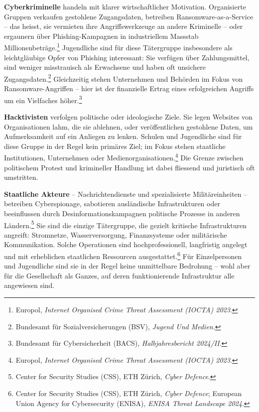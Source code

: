 \documentclass[
  nswissgerman,
  a4paper,
  DIV=11,
  numbers=noendperiod,
  ngerman]{scrreprt}
\begin{document}
\textbf{Cyberkriminelle} handeln mit klarer wirtschaftlicher Motivation.
Organisierte Gruppen verkaufen gestohlene Zugangsdaten, betreiben
Ransomware-as-a-Service -- das heisst, sie vermieten ihre
Angriffswerkzeuge an andere Kriminelle -- oder ergaunern über
Phishing-Kampagnen in industriellem Massstab
Millionenbeträge.\footnote{Europol, \emph{Internet Organised Crime
  Threat Assessment ({IOCTA}) 2023}.} Jugendliche sind für diese
Tätergruppe insbesondere als leichtgläubige Opfer von Phishing
interessant: Sie verfügen über Zahlungsmittel, sind weniger misstrauisch
als Erwachsene und haben oft unsichere Zugangsdaten.\footnote{Bundesamt
  für Sozialversicherungen (BSV), \emph{Jugend Und Medien}.}
Gleichzeitig stehen Unternehmen und Behörden im Fokus von
Ransomware-Angriffen -- hier ist der finanzielle Ertrag eines
erfolgreichen Angriffs um ein Vielfaches höher.\footnote{Bundesamt für
  Cybersicherheit (BACS), \emph{Halbjahresbericht 2024/{II}}.}

\textbf{Hacktivisten} verfolgen politische oder ideologische Ziele. Sie
legen Websites von Organisationen lahm, die sie ablehnen, oder
veröffentlichen gestohlene Daten, um Aufmerksamkeit auf ein Anliegen zu
lenken. Schulen und Jugendliche sind für diese Gruppe in der Regel kein
primäres Ziel; im Fokus stehen staatliche Institutionen, Unternehmen
oder Medienorganisationen.\footnote{Europol, \emph{Internet Organised
  Crime Threat Assessment ({IOCTA}) 2023}.} Die Grenze zwischen
politischem Protest und krimineller Handlung ist dabei fliessend und
juristisch oft umstritten.

\textbf{Staatliche Akteure} -- Nachrichtendienste und spezialisierte
Militäreinheiten -- betreiben Cyberspionage, sabotieren ausländische
Infrastrukturen oder beeinflussen durch Desinformationskampagnen
politische Prozesse in anderen Ländern.\footnote{Center for Security
  Studies (CSS), ETH Zürich, \emph{Cyber Defence}.} Sie sind die einzige
Tätergruppe, die gezielt kritische Infrastrukturen angreift: Stromnetze,
Wasserversorgung, Finanzsysteme oder militärische Kommunikation. Solche
Operationen sind hochprofessionell, langfristig angelegt und mit
erheblichen staatlichen Ressourcen ausgestattet.\footnote{Center for
  Security Studies (CSS), ETH Zürich, \emph{Cyber Defence}; European
  Union Agency for Cybersecurity (ENISA), \emph{{ENISA} Threat Landscape
  2024}.} Für Einzelpersonen und Jugendliche sind sie in der Regel keine
unmittelbare Bedrohung -- wohl aber für die Gesellschaft als Ganzes, auf
deren funktionierende Infrastruktur alle angewiesen sind.
\end{document}
